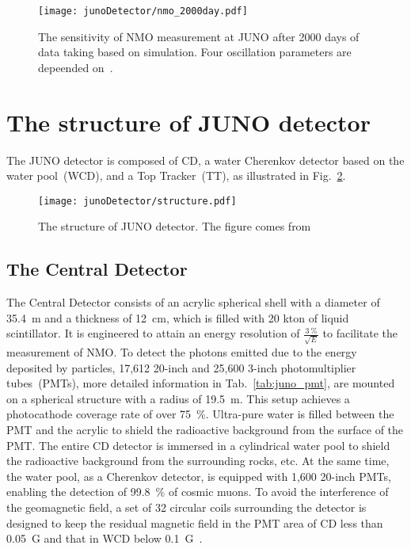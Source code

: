 \begin{figure}[htbp]
	\centering
	\texttt{[image: junoDetector/nmo\_2000day.pdf]}
	\caption{The sensitivity of NMO measurement at JUNO after 2000 days of data taking based on simulation. Four oscillation parameters are depeended on~\cite{muon207}.}
	\label{fig:juno_nmo_2000}
\end{figure}

\section{The structure of JUNO detector}
The JUNO detector is composed of CD, a water Cherenkov detector based on the water pool~(WCD), and a Top Tracker~(TT), as illustrated in Fig.~\ref{fig:juno_cd_structure}.
\begin{figure}[htbp]
	\centering
	\texttt{[image: junoDetector/structure.pdf]}
	\caption{The structure of JUNO detector. The figure comes from~\cite{muon207}}
	\label{fig:juno_cd_structure}
\end{figure}
\subsection{The Central Detector}
The Central Detector consists of an acrylic spherical shell with a diameter of \SI{35.4}{m} and a thickness of \SI{12}{cm}, which is filled with 20 kton of liquid scintillator. It is engineered to attain an energy resolution of $\frac{\SI{3}{\%}}{\sqrt{E}}$ to facilitate the measurement of NMO. To detect the photons emitted due to the energy deposited by particles, 17,612 20-inch and 25,600 3-inch photomultiplier tubes~(PMTs), more detailed information in Tab.~\ref{tab:juno_pmt}, are mounted on a spherical structure with a radius of \SI{19.5}{m}. This setup achieves a photocathode coverage rate of over \SI{75}{\%}. Ultra-pure water is filled between the PMT and the acrylic to shield the radioactive background from the surface of the PMT. The entire CD detector is immersed in a cylindrical water pool to shield the radioactive background from the surrounding rocks, etc. At the same time, the water pool, as a Cherenkov detector, is equipped with 1,600 20-inch PMTs, enabling the detection of \SI{99.8}{\%} of cosmic muons. To avoid the interference of the geomagnetic field, a set of 32 circular coils surrounding the detector is designed to keep the residual magnetic field in the PMT area of CD less than \SI{0.05}{G} and that in WCD below \SI{0.1}{G}~\cite{muon207}.

